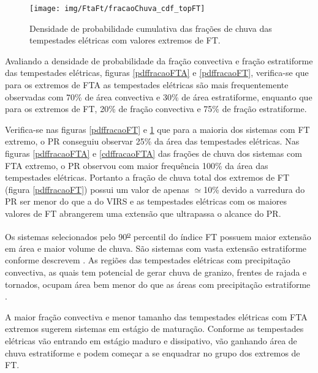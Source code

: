 \begin{figure}[!ht]
  \centering 
  \texttt{[image: img/FtaFt/fracaoChuva\_cdf\_topFT]}
  \caption{Densidade de probabilidade cumulativa das frações de chuva das tempestades elétricas com valores extremos de FT.}
  \label{cdffracaoFT}
\end{figure}



Avaliando a densidade de probabilidade da fração convectiva e fração estratiforme das tempestades elétricas, figuras \ref{pdffracaoFTA} e \ref{pdffracaoFT}, verifica-se que para os extremos de FTA as tempestades elétricas são mais frequentemente observadas com 70\% de área convectiva e 30\% de área estratiforme, enquanto que para os extremos de FT, 20\% de fração convectiva e 75\% de fração estratiforme.

Verifica-se nas figuras \ref{pdffracaoFT} e \ref{cdffracaoFT} que para a maioria dos sistemas com FT extremo, o PR conseguiu observar 25\% da área das tempestades elétricas. Nas figuras \ref{pdffracaoFTA} e \ref{cdffracaoFTA} das frações de chuva dos sistemas com FTA extremo, o PR observou com maior frequência 100\% da área das tempestades elétricas. Portanto a fração de chuva total dos extremos de FT (figura \ref{pdffracaoFT}) possui um valor de apenas $\simeq$10\% devido a varredura do PR ser menor do que a do VIRS e as tempestades elétricas com os maiores valores de FT abrangerem uma extensão que ultrapassa o alcance do PR. 


Os sistemas selecionados pelo 90\textsuperscript{\underline{o}} percentil do índice FT possuem maior extensão em área e maior volume de chuva. São sistemas com vasta extensão estratiforme conforme descrevem . As regiões das tempestades elétricas com precipitação convectiva, as quais tem potencial de gerar chuva de granizo, frentes de rajada e tornados, ocupam área bem menor do que as áreas com  precipitação estratiforme \cite{Jr2007}.

A maior fração convectiva e menor tamanho das tempestades elétricas com FTA extremos sugerem sistemas em estágio de maturação. Conforme as tempestades elétricas vão entrando em estágio maduro e dissipativo, vão ganhando área de chuva estratiforme e podem começar a se enquadrar no grupo dos extremos de FT. 


